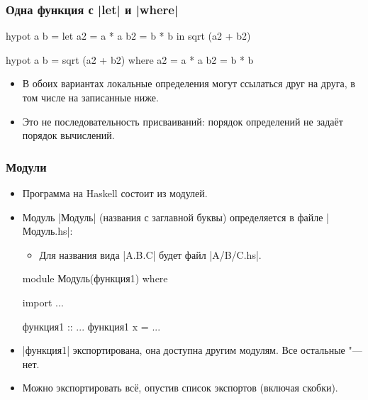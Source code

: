 \documentclass[10pt]{beamer}
\begin{document}
\begin{frame}[fragile]
  \frametitle{Одна функция с \haskinline|let| и \haskinline|where|}
  \begin{haskell}
    hypot a b =
        let a2 = a * a
            b2 = b * b
        in sqrt (a2 + b2)
  \end{haskell}
  \begin{haskell}
    hypot a b = sqrt (a2 + b2)
      where a2 = a * a
            b2 = b * b
  \end{haskell}
  \begin{itemize}
    \item В обоих вариантах локальные определения могут ссылаться друг на друга, в том числе на записанные ниже.
    \item Это не последовательность присваиваний: порядок определений не задаёт порядок вычислений.
  \end{itemize}
\end{frame}
\begin{frame}[fragile]
  \frametitle{Модули}
  \begin{itemize}
    \item Программа на Haskell состоит из модулей.
    \item Модуль \haskinline|Модуль| (названия с заглавной буквы) определяется в файле \haskinline|Модуль.hs|:
          \begin{itemize}
            \item Для названия вида \haskinline|A.B.C| будет файл \ghcinline|A/B/C.hs|.
          \end{itemize}
          \begin{haskell}
            module Модуль(функция1) where

            import ...

            функция1 :: ...
            функция1 x = ...
          \end{haskell}
    \item \haskinline|функция1| экспортирована, она доступна другим модулям. Все остальные "--- нет.
    \item Можно экспортировать всё, опустив список экспортов (включая скобки).
  \end{itemize}
\end{frame}
\end{document}
